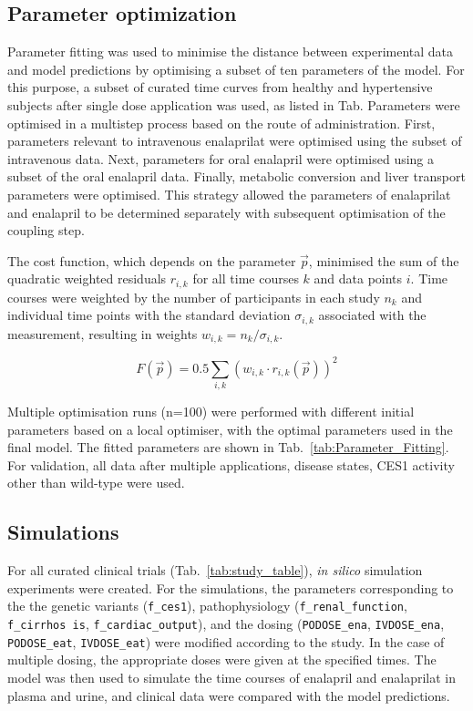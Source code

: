 \documentclass[pharmaceutics,article,submit,pdftex,moreauthors]{Definitions/mdpi}
\begin{document}

\subsection{Parameter optimization}
\label{sec:methods_fitting}
Parameter fitting was used to minimise the distance between experimental data and model predictions by optimising a subset of ten parameters of the model. For this purpose, a subset of curated time curves from healthy and hypertensive subjects after single dose application was used, as listed in Tab.
Parameters were optimised in a multistep process based on the route of administration. First, parameters relevant to intravenous enalaprilat were optimised using the subset of intravenous data. Next, parameters for oral enalapril were optimised using a subset of the oral enalapril data. Finally, metabolic conversion and liver transport parameters were optimised. This strategy allowed the parameters of enalaprilat and enalapril to be determined separately with subsequent optimisation of the coupling step.

The cost function, which depends on the parameter $\vec{p}$, minimised the sum of the quadratic weighted residuals $r_{i,k}$ for all time courses $k$ and data points $i$. Time courses were weighted by the number of participants in each study $n_k$ and individual time points with the standard deviation $\sigma_{i,k}$ associated with the measurement, resulting in weights $w_{i,k} = n_k/\sigma_{i,k}$.

\begin{equation*}
   F(\vec{p})= 0.5 \sum_{i,k} (w_{i,k} \cdot r_{i,k}(\vec{p}))^2
\end{equation*}

Multiple optimisation runs (n=100) were performed with different initial parameters based on a local optimiser, with the optimal parameters used in the final model. The fitted parameters are shown in Tab.~\ref{tab:Parameter_Fitting}. For validation, all data after multiple applications, disease states, CES1 activity other than wild-type were used.

\subsection{Simulations}
\label{sec:methods_simulations}
For all curated clinical trials (Tab.~\ref{tab:study_table}), \textit{in silico} simulation experiments were created. For the simulations, the parameters corresponding to the the genetic variants (\texttt{f\_ces1}), pathophysiology (\texttt{f\_renal\_function}, \texttt{f\_cirrhos
is}, \texttt{f\_cardiac\_output}),  and the dosing (\texttt{PODOSE\_ena}, \texttt{IVDOSE\_ena}, \texttt{PODOSE\_eat}, \texttt{IVDOSE\_eat}) were modified according to the study. In the case of multiple dosing, the appropriate doses were given at the specified times. The model was then used to simulate the time courses of enalapril and enalaprilat in plasma and urine, and clinical data were compared with the model predictions.
\end{document}
